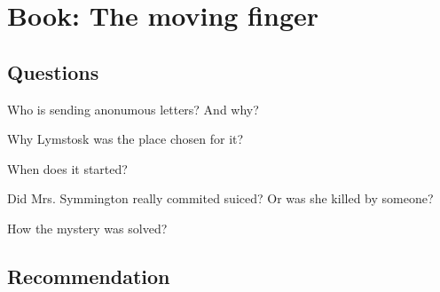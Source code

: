 \documentclass[a4paper,12pt]{article}
\begin{document}
\titleTMB 
\newpage
{} %


\section*{Book: The moving finger}
\subsection*{Questions}

\begin{description}

\item[Who is sending anonumous letters? And why?]
  {
  }
  

\item[Why Lymstosk was the place chosen for it?]
  {
  }

  
\item[When does it started?]
  {
  }
  
  
\item[Did Mrs. Symmington really commited suiced? Or was she killed by someone?]
  {
  }

  
\item[How the mystery was solved?]
  {
  }
  




  
\end{description}



\subsection*{Recommendation}
\end{document}
